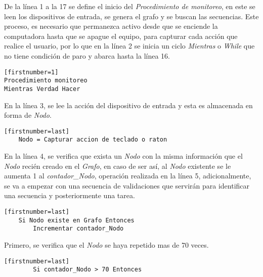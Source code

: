 
De la l\'inea 1 a la 17 se define el inicio del \emph{Procedimiento de 
 monitoreo}, en este se leen los dispositivos de entrada, se genera el grafo 
 y se buscan las secuencias. Este proceso, es necesario que permanezca activo 
 desde que se enciende la computadora hasta que se apague el equipo, para 
 capturar cada acci\'on que realice el usuario, por lo que en la l\'inea 2 se 
 inicia un ciclo \emph{Mientras} o \emph{While} que no tiene condici\'on de 
 paro y abarca hasta la l\'inea 16. 

\begin{tiny}
\begin{lstlisting}[name=EXmonitor][firstnumber=1]
Procedimiento monitoreo
Mientras Verdad Hacer
\end{lstlisting}
\end{tiny}

En la l\'inea 3, se lee la acci\'on del dispositivo de entrada y esta es 
 almacenada en forma de \emph{Nodo}.


\begin{tiny}
\begin{lstlisting}[name=EXmonitor][firstnumber=last]
    Nodo = Capturar accion de teclado o raton
\end{lstlisting}
\end{tiny}

En la l\'inea 4, se verifica que exista un \emph{Nodo} con la misma 
 informaci\'on que el \emph{Nodo} reci\'en creado en el \emph{Grafo}, en caso 
 de ser as\'i, al \emph{Nodo} existente se le aumenta 1 al 
 \emph{contador\_Nodo}, operaci\'on realizada en la l\'inea 5, 
 adicionalmente, se va a empezar con una secuencia de validaciones que 
 servir\'an para identificar una secuencia y posteriormente una tarea. 

\begin{tiny}
\begin{lstlisting}[name=EXmonitor][firstnumber=last]
    Si Nodo existe en Grafo Entonces
        Incrementar contador_Nodo
\end{lstlisting}
\end{tiny}

Primero, se verifica que el \emph{Nodo} se haya repetido mas de 70 veces.

\begin{tiny}
\begin{lstlisting}[name=EXmonitor][firstnumber=last]
        Si contador_Nodo > 70 Entonces
\end{lstlisting}
\end{tiny}

